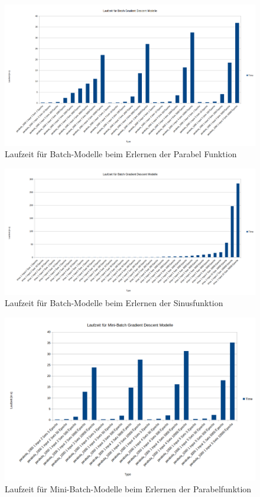 \begin{figure}[htbp]
	\centering
	\includegraphics[angle=-90,totalheight=\textheight]{images/charts/BatchGradientTimeParabola.png}
	\caption{Laufzeit für Batch-Modelle beim Erlernen der Parabel Funktion}
\end{figure}

\begin{figure}[htbp]
	\centering
	\includegraphics[angle=-90,totalheight=\textheight]{images/charts/BatchGradientTimeSinus.png}
	\caption{Laufzeit für Batch-Modelle beim Erlernen der Sinusfunktion}
\end{figure}

\begin{figure}[htbp]
	\centering
	\includegraphics[angle=-90,totalheight=\textheight]{images/charts/Mini-BatchGradientTimeParabola.png}
	\caption{Laufzeit für Mini-Batch-Modelle beim Erlernen der Parabelfunktion}
\end{figure}

